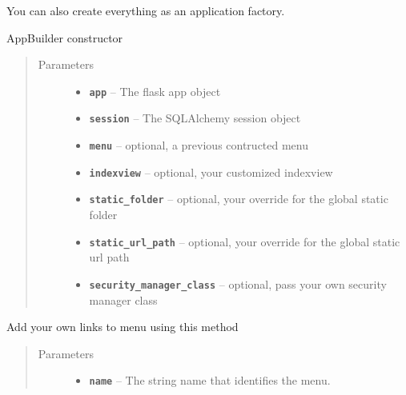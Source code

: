 \documentclass[letterpaper,10pt,english]{sphinxmanual}
\begin{document}
\begin{fulllineitems}
You can also create everything as an application factory.

\begin{fulllineitems}
\label{api:flask.ext.appbuilder.base.AppBuilder.__init__}
AppBuilder constructor
\begin{quote}\begin{description}
\item[{Parameters}] \leavevmode\begin{itemize}
\item {} 
\textbf{\texttt{app}} -- The flask app object

\item {} 
\textbf{\texttt{session}} -- The SQLAlchemy session object

\item {} 
\textbf{\texttt{menu}} -- optional, a previous contructed menu

\item {} 
\textbf{\texttt{indexview}} -- optional, your customized indexview

\item {} 
\textbf{\texttt{static\_folder}} -- optional, your override for the global static folder

\item {} 
\textbf{\texttt{static\_url\_path}} -- optional, your override for the global static url path

\item {} 
\textbf{\texttt{security\_manager\_class}} -- optional, pass your own security manager class

\end{itemize}

\end{description}\end{quote}

\end{fulllineitems}


\begin{fulllineitems}
\label{api:flask.ext.appbuilder.base.AppBuilder.add_link}
Add your own links to menu using this method
\begin{quote}\begin{description}
\item[{Parameters}] \leavevmode\begin{itemize}
\item {} 
\textbf{\texttt{name}} -- The string name that identifies the menu.


\end{itemize}
\end{description}
\end{quote}
\end{fulllineitems}
\end{fulllineitems}
\end{document}
